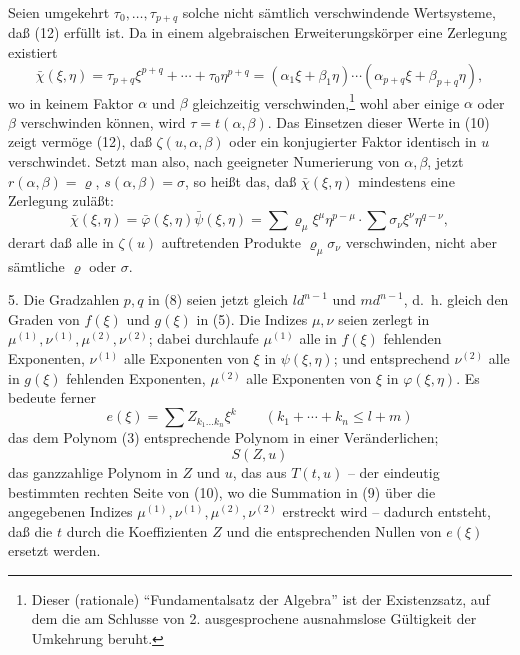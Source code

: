 \documentclass[11pt]{article}
\begin{document}
Seien umgekehrt $\tau_0,\ldots,\tau_{p+q}$ solche nicht sämtlich verschwindende Wertsysteme, daß (12) erfüllt ist. Da in einem algebraischen Erweiterungskörper eine Zerlegung existiert
\begin{equation}
 \bar\chi(\xi,\eta)=\tau_{p+q}\xi^{p+q}+\cdots+\tau_0\eta^{p+q}
=(\alpha_1\xi+\beta_1\eta)\cdots(\alpha_{p+q}\xi+\beta_{p+q}\eta),
\tag{12'}
\end{equation}
wo in keinem Faktor $\alpha$ und $\beta$ gleichzeitig verschwinden,\footnote{Dieser (rationale) ``Fundamentalsatz der Algebra'' ist der Existenzsatz, auf dem die am Schlusse von 2. ausgesprochene ausnahmslose Gültigkeit der Umkehrung beruht.} wohl aber einige $\alpha$ oder $\beta$ verschwinden können, wird $\tau=t(\alpha,\beta)$. Das Einsetzen dieser Werte in (10) zeigt vermöge (12), daß $\zeta(u,\alpha,\beta)$ oder ein konjugierter Faktor identisch in $u$ verschwindet. Setzt man also, nach geeigneter Numerierung von $\alpha,\beta$, jetzt $r(\alpha,\beta)=\varrho$, $s(\alpha,\beta)=\sigma$, so heißt das, daß $\bar\chi(\xi,\eta)$ mindestens eine Zerlegung zuläßt:
\begin{equation}
\bar\chi(\xi,\eta)=\bar\varphi(\xi,\eta)\bar\psi(\xi,\eta)
=\sum \varrho_\mu\xi^\mu\eta^{p-\mu}\cdot\sum \sigma_\nu\xi^\nu\eta^{q-\nu},
\tag{13}
\end{equation}
derart daß alle in $\zeta(u)$ auftretenden Produkte $\varrho_\mu\sigma_\nu$ verschwinden, nicht aber sämtliche $\varrho$ oder $\sigma$.

5. Die Gradzahlen $p,q$ in (8) seien jetzt gleich $ld^{n-1}$ und $md^{n-1}$, d.~h. gleich den Graden von $f(\xi)$ und $g(\xi)$ in (5). Die Indizes $\mu,\nu$ seien zerlegt in $\mu^{(1)},\nu^{(1)},\mu^{(2)},\nu^{(2)}$; dabei durchlaufe $\mu^{(1)}$ alle in $f(\xi)$ fehlenden Exponenten, $\nu^{(1)}$ alle Exponenten von $\xi$ in $\psi(\xi,\eta)$; und entsprechend $\nu^{(2)}$ alle in $g(\xi)$ fehlenden Exponenten, $\mu^{(2)}$ alle Exponenten von $\xi$ in $\varphi(\xi,\eta)$. Es bedeute ferner
\[
 e(\xi)=\sum Z_{k_1\ldots k_n}\xi^k\qquad(k_1+\cdots+k_n\le l+m)
\]
das dem Polynom (3) entsprechende Polynom in einer Veränderlichen;
\[
 S(Z,u)
\]
das ganzzahlige Polynom in $Z$ und $u$, das aus $T(t,u)$ -- der eindeutig bestimmten rechten Seite von (10), wo die Summation in (9) über die angegebenen Indizes $\mu^{(1)},\nu^{(1)},\mu^{(2)},\nu^{(2)}$ erstreckt wird -- dadurch entsteht, daß die $t$ durch die Koeffizienten $Z$ und die entsprechenden Nullen von $e(\xi)$ ersetzt werden.
\end{document}
